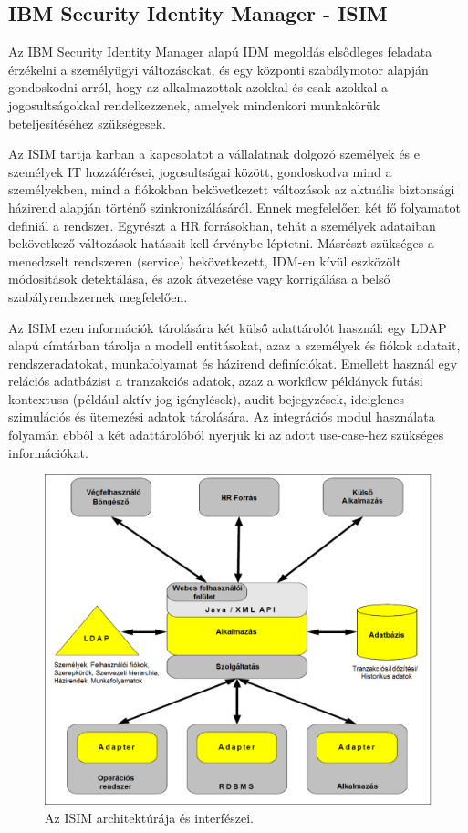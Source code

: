\subsection{IBM Security Identity Manager - ISIM}
\label{subsec:ISIM}
Az IBM Security Identity Manager alapú IDM megoldás elsődleges feladata érzékelni a személyügyi változásokat, és egy központi szabálymotor alapján gondoskodni arról, hogy az alkalmazottak azokkal és csak azokkal a jogosultságokkal rendelkezzenek, amelyek mindenkori munkakörük beteljesítéséhez szükségesek.

Az ISIM tartja karban a kapcsolatot a vállalatnak dolgozó személyek és e személyek IT hozzáférései, jogosultságai között, gondoskodva mind a személyekben, mind a fiókokban bekövetkezett változások az aktuális biztonsági házirend alapján történő szinkronizálásáról. Ennek megfelelően két fő folyamatot definiál a rendszer.
Egyrészt a HR forrásokban, tehát a személyek adataiban bekövetkező változások hatásait kell érvénybe léptetni. Másrészt szükséges a menedzselt rendszeren (service) bekövetkezett, IDM-en kívül eszközölt módosítások detektálása, és azok átvezetése vagy korrigálása a belső szabályrendszernek megfelelően. 

Az ISIM ezen információk tárolására két külső adattárolót használ: egy LDAP alapú címtárban tárolja a modell entitásokat, azaz a személyek és fiókok adatait, rendszeradatokat, munkafolyamat és házirend definíciókat. Emellett használ egy relációs adatbázist a tranzakciós adatok, azaz a workflow példányok futási kontextusa (például aktív jog igénylések), audit bejegyzések, ideiglenes szimulációs és ütemezési adatok tárolására. Az integrációs modul használata folyamán ebből a két adattárolóból nyerjük ki az adott use-case-hez szükséges információkat.

\begin{figure}
	\centering
	\includegraphics[width=0.5\linewidth]{figures/ISIM_promo.png}
	\caption{Az ISIM architektúrája és interfészei.}
	\label{fig:isim-promo}
\end{figure}


